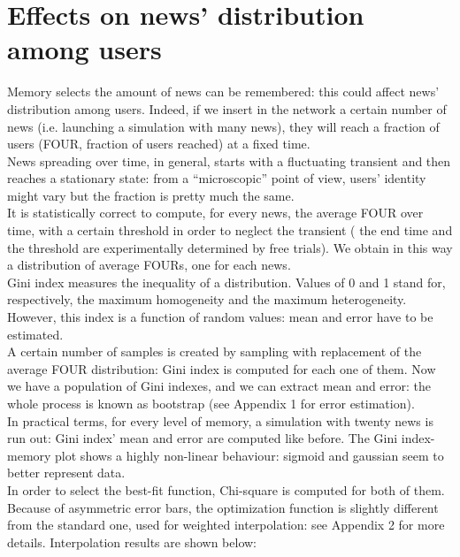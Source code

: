 \section{Effects on news' distribution among users}
Memory selects the amount of news can be remembered: this could affect news' distribution among users.
Indeed, if we insert in the network a certain number of news (i.e. launching a simulation with many news), they will reach a fraction of users (FOUR, fraction of users reached) at a fixed time.\\
News spreading over time, in general, starts with a fluctuating transient and then reaches a stationary state: from a ``microscopic'' point of view, users' identity might vary but the fraction is pretty much the same. \\
It is statistically correct to compute, for every news, the average FOUR over time, with a certain threshold in order to neglect the transient ( the end time and the threshold are experimentally determined by free trials).
We obtain in this  way a distribution of average FOURs, one for each news.\\
Gini index measures the inequality of a distribution. Values of 0 and 1 stand for, respectively, the maximum homogeneity and the maximum heterogeneity.
However, this index is a function of random values: mean and error have to be estimated.\\
A certain number of samples is created by sampling with replacement of the average FOUR distribution: Gini index is computed for each one of them.
Now we have a population of Gini indexes, and we can extract mean and error: the whole process is known as bootstrap (see Appendix 1 for error estimation).\\
In practical terms, for every level of  memory, a simulation with twenty news is run out: Gini index' mean and error are computed like before.
The Gini index-memory plot shows a highly non-linear behaviour: sigmoid and gaussian seem to better represent data.\\
 In order to select the best-fit function, Chi-square is computed for both of them. \\
Because of asymmetric error bars, the optimization function is slightly different from the standard one, used for weighted interpolation: see Appendix 2 for more details.
Interpolation results are shown below:


